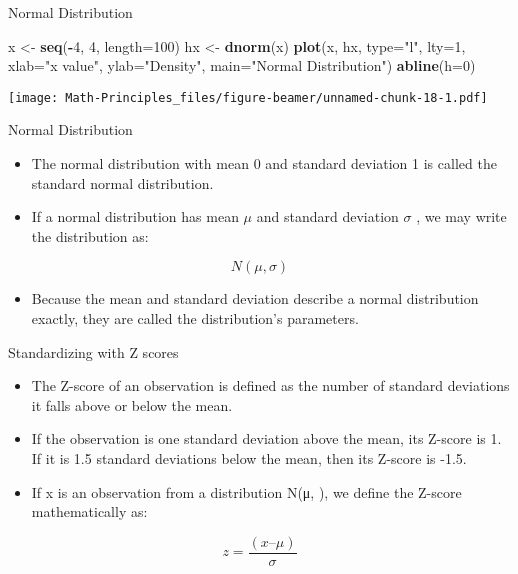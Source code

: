 \documentclass[
  ignorenonframetext,
]{beamer}
\newenvironment{Shaded}{\begin{snugshade}}{\end{snugshade}}
\newcommand{\DataTypeTok}[1]{\textcolor[rgb]{0.13,0.29,0.53}{#1}}
\newcommand{\DecValTok}[1]{\textcolor[rgb]{0.00,0.00,0.81}{#1}}
\newcommand{\KeywordTok}[1]{\textcolor[rgb]{0.13,0.29,0.53}{\textbf{#1}}}
\newcommand{\NormalTok}[1]{#1}
\newcommand{\OperatorTok}[1]{\textcolor[rgb]{0.81,0.36,0.00}{\textbf{#1}}}
\newcommand{\StringTok}[1]{\textcolor[rgb]{0.31,0.60,0.02}{#1}}
\providecommand{\tightlist}{%
  \setlength{\itemsep}{0pt}\setlength{\parskip}{0pt}}
\begin{document}
\begin{frame}[fragile]{Normal Distribution}
\protect\hypertarget{normal-distribution-2}{}

\begin{Shaded}
\begin{Highlighting}[]
\NormalTok{x <-}\StringTok{ }\KeywordTok{seq}\NormalTok{(}\OperatorTok{-}\DecValTok{4}\NormalTok{, }\DecValTok{4}\NormalTok{, }\DataTypeTok{length=}\DecValTok{100}\NormalTok{)}
\NormalTok{hx <-}\StringTok{ }\KeywordTok{dnorm}\NormalTok{(x)}
\KeywordTok{plot}\NormalTok{(x, hx, }\DataTypeTok{type=}\StringTok{"l"}\NormalTok{, }\DataTypeTok{lty=}\DecValTok{1}\NormalTok{, }\DataTypeTok{xlab=}\StringTok{"x value"}\NormalTok{, }\DataTypeTok{ylab=}\StringTok{"Density"}\NormalTok{, }\DataTypeTok{main=}\StringTok{"Normal Distribution"}\NormalTok{)}
\KeywordTok{abline}\NormalTok{(}\DataTypeTok{h=}\DecValTok{0}\NormalTok{)}
\end{Highlighting}
\end{Shaded}

\texttt{[image: Math-Principles\_files/figure-beamer/unnamed-chunk-18-1.pdf]}

\end{frame}

\begin{frame}{Normal Distribution}
\protect\hypertarget{normal-distribution-3}{}

\begin{itemize}
\item
  The normal distribution with mean 0 and standard deviation 1 is called
  the standard normal distribution.
\item
  If a normal distribution has mean \(\mu\) and standard deviation
  \(\sigma\) , we may write the distribution as:
\end{itemize}

\[N(\mu, \sigma)\]

\begin{itemize}
\tightlist
\item
  Because the mean and standard deviation describe a normal distribution
  exactly, they are called the distribution's parameters.
\end{itemize}

\end{frame}

\begin{frame}{Standardizing with Z scores}
\protect\hypertarget{standardizing-with-z-scores}{}

\begin{itemize}
\item
  The Z-score of an observation is defined as the number of standard
  deviations it falls above or below the mean.
\item
  If the observation is one standard deviation above the mean, its
  Z-score is 1. If it is 1.5 standard deviations below the mean, then
  its Z-score is -1.5.
\item
  If x is an observation from a distribution N(μ, ), we define the
  Z-score mathematically as:
\end{itemize}

\[z = \frac{(x – μ)}{σ}\]

\end{frame}
\end{document}
